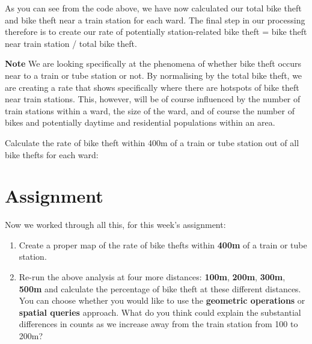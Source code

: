 \documentclass[
]{book}
\newenvironment{Shaded}{\begin{snugshade}}{\end{snugshade}}
\newcommand{\CommentTok}[1]{\textcolor[rgb]{0.56,0.35,0.01}{\textit{#1}}}
\newcommand{\DecValTok}[1]{\textcolor[rgb]{0.00,0.00,0.81}{#1}}
\newcommand{\NormalTok}[1]{#1}
\newcommand{\OtherTok}[1]{\textcolor[rgb]{0.56,0.35,0.01}{#1}}
\newcommand{\SpecialCharTok}[1]{\textcolor[rgb]{0.00,0.00,0.00}{#1}}
\providecommand{\tightlist}{%
  \setlength{\itemsep}{0pt}\setlength{\parskip}{0pt}}
\begin{document}
As you can see from the code above, we have now calculated our total bike theft and bike theft near a train station for each ward. The final step in our processing therefore is to create our rate of potentially station-related bike theft = bike theft near train station / total bike theft.

\textbf{Note}
We are looking specifically at the phenomena of whether bike theft occurs near to a train or tube station or not. By normalising by the total bike theft, we are creating a rate that shows specifically where there are hotspots of bike theft near train stations. This, however, will be of course influenced by the number of train stations within a ward, the size of the ward, and of course the number of bikes and potentially daytime and residential populations within an area.

Calculate the rate of bike theft within 400m of a train or tube station out of all bike thefts for each ward:

\begin{Shaded}
\end{Shaded}

\hypertarget{assignment-w06}{%
\section{Assignment}\label{assignment-w06}}

Now we worked through all this, for this week's assignment:

\begin{enumerate}
\def\labelenumi{\arabic{enumi}.}
\tightlist
\item
  Create a proper map of the rate of bike thefts within \textbf{400m} of a train or tube station.
\item
  Re-run the above analysis at four more distances: \textbf{100m}, \textbf{200m}, \textbf{300m}, \textbf{500m} and calculate the percentage of bike theft at these different distances. You can choose whether you would like to use the \textbf{geometric operations} or \textbf{spatial queries} approach. What do you think could explain the substantial differences in counts as we increase away from the train station from 100 to 200m?
\end{enumerate}
\end{document}
